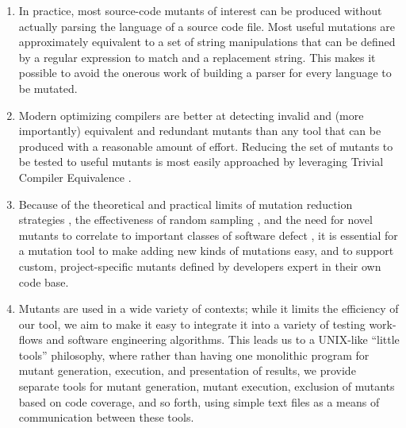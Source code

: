 \begin{enumerate}
\item In practice, most source-code mutants of interest can be
  produced without actually parsing the language of a source code
  file.  Most useful mutations are approximately equivalent to a
  set of string manipulations that can be defined by a regular
  expression to match and a replacement string.  This makes it
  possible to avoid the onerous work of building a parser for every
  language to be mutated.
\item Modern optimizing compilers are better at detecting invalid and
  (more importantly) equivalent and redundant mutants than any tool
  that can be produced with a reasonable amount of effort.  Reducing
  the set of mutants to be tested to useful mutants is most easily
  approached by leveraging Trivial Compiler Equivalence \cite{TCE}.
\item Because of the theoretical and practical limits of mutation
  reduction strategies \cite{Gopinath1,Gopinath2}, the
  effectiveness of random sampling \cite{Gopinath3}, and the need for
  novel mutants to correlate to important classes of software defect
  \cite{Just2014mutants}, it is essential for a mutation tool to make adding new
  kinds of mutations easy, and to support custom, project-specific
  mutants defined by developers expert in their own code base.
\item Mutants are used in a wide variety of contexts; while it limits
  the efficiency of our tool, we aim to make it easy to integrate it
  into a variety of testing work-flows and software engineering
  algorithms.  This leads us to a UNIX-like ``little tools''
  philosophy, where rather than having one monolithic program for
  mutant generation, execution, and presentation of results, we
  provide separate tools for mutant generation, mutant execution,
  exclusion of mutants based on code coverage, and so forth, using
  simple text files as a means of communication between these tools.
\end{enumerate}


